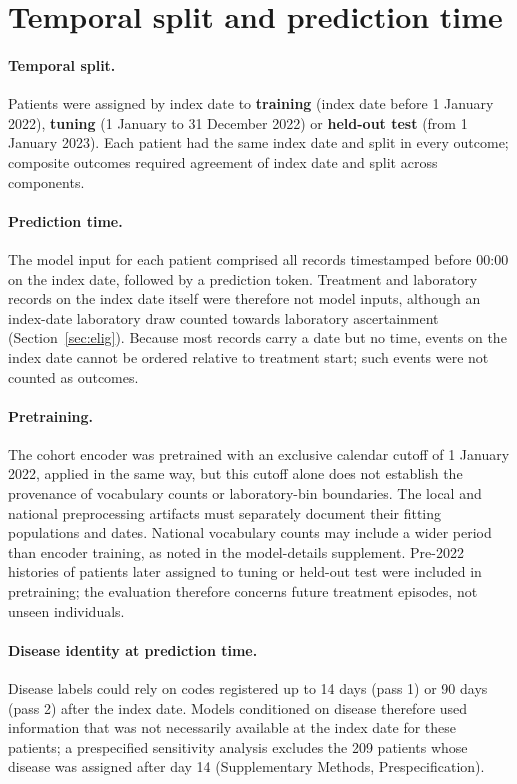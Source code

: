 \documentclass[10pt]{article}
\begin{document}
\section{Temporal split and prediction time}\label{sec:split}

\paragraph{Temporal split.} Patients were assigned by index date to
\textbf{training} (index date before 1 January 2022), \textbf{tuning} (1
January to 31 December 2022) or \textbf{held-out test} (from 1 January 2023).
Each patient had the same index date and split in every outcome; composite
outcomes required agreement of index date and split across components.

\paragraph{Prediction time.} The model input for each patient comprised all
records timestamped before 00:00 on the index date, followed by a prediction
token. Treatment and laboratory records on the index date itself were
therefore not model inputs, although an index-date laboratory draw counted
towards laboratory ascertainment (Section~\ref{sec:elig}). Because most
records carry a date but no time, events on the index date cannot be ordered
relative to treatment start; such events were not counted as outcomes.

\paragraph{Pretraining.} The cohort encoder was pretrained with an exclusive
calendar cutoff of 1 January 2022, applied in the same way, but this cutoff alone does not establish the provenance of vocabulary counts
or laboratory-bin boundaries. The local and national preprocessing artifacts
must separately document their fitting populations and dates. National
vocabulary counts may include a wider period than encoder training, as noted
in the model-details supplement. Pre-2022
histories of patients later assigned to tuning or held-out test were included
in pretraining; the evaluation therefore concerns future treatment episodes,
not unseen individuals.

\paragraph{Disease identity at prediction time.} Disease labels could rely on
codes registered up to 14 days (pass 1) or 90 days (pass 2) after the index
date. Models conditioned on disease therefore used information that was not
necessarily available at the index date for these patients; a prespecified
sensitivity analysis excludes the 209 patients whose disease was assigned after
day 14 (Supplementary Methods, Prespecification).
\end{document}
